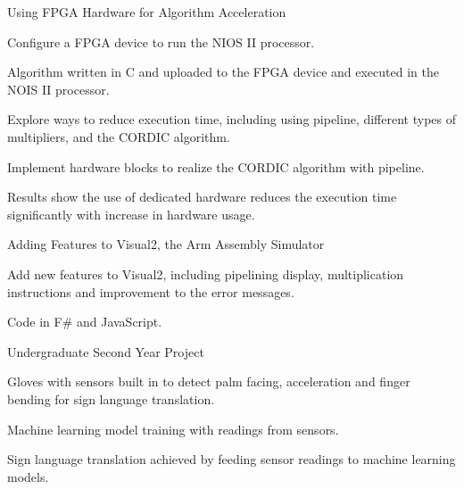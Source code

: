 \begin{cventries}
    \cventry
    {} %
    {Using FPGA Hardware for Algorithm Acceleration} %
    {} %
    {} %
    {
      \begin{cvitems} %
        \item {Configure a FPGA device to run the NIOS II processor.}
        \item {Algorithm written in C and uploaded to the FPGA device and executed in the NOIS II processor.}
        \item {Explore ways to reduce execution time, including using pipeline, different types of multipliers, and the CORDIC algorithm.}
        \item {Implement hardware blocks to realize the CORDIC algorithm with pipeline.}
        \item {Results show the use of dedicated hardware reduces the execution time significantly with increase in hardware usage.}
      \end{cvitems}
    }
    
    \cventry
    {} %
    {Adding Features to Visual2, the Arm Assembly Simulator} %
    {} %
    {} %
    {
      \begin{cvitems} %
        \item {Add new features to Visual2, including pipelining display, multiplication instructions and improvement to the error messages.}
        \item {Code in F\# and JavaScript.}
      \end{cvitems}
    }
    
    \cventry
    {} %
    {Undergraduate Second Year Project} %
    {} %
    {} %
    {
      \begin{cvitems} %
        \item {Gloves with sensors built in to detect palm facing, acceleration and finger bending for sign language translation.}
        \item {Machine learning model training with readings from sensors.}
        \item {Sign language translation achieved by feeding sensor readings to machine learning models.}
      \end{cvitems}
    }

\end{cventries}